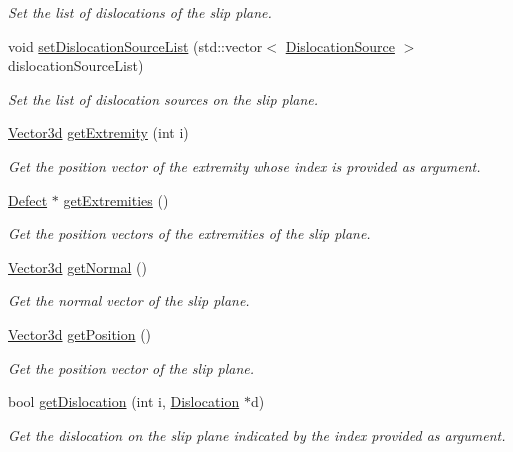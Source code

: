 \begin{DoxyCompactItemize}
\begin{DoxyCompactList}\small\item\em Set the list of dislocations of the slip plane. \end{DoxyCompactList}\item 
void \hyperlink{classSlipPlane_a6f520005b3c7e8c93df0b893201cea29}{set\-Dislocation\-Source\-List} (std\-::vector$<$ \hyperlink{classDislocationSource}{Dislocation\-Source} $>$ dislocation\-Source\-List)
\begin{DoxyCompactList}\small\item\em Set the list of dislocation sources on the slip plane. \end{DoxyCompactList}\item 
\hyperlink{classVector3d}{Vector3d} \hyperlink{classSlipPlane_ad2879c70242d30e34cc4c52d90413ef4}{get\-Extremity} (int i)
\begin{DoxyCompactList}\small\item\em Get the position vector of the extremity whose index is provided as argument. \end{DoxyCompactList}\item 
\hyperlink{classDefect}{Defect} $\ast$ \hyperlink{classSlipPlane_a6559d8a911b5c13e7b2ff4e99372d5b2}{get\-Extremities} ()
\begin{DoxyCompactList}\small\item\em Get the position vectors of the extremities of the slip plane. \end{DoxyCompactList}\item 
\hyperlink{classVector3d}{Vector3d} \hyperlink{classSlipPlane_ab272f2aca3f35aed68343cf02354b7ba}{get\-Normal} ()
\begin{DoxyCompactList}\small\item\em Get the normal vector of the slip plane. \end{DoxyCompactList}\item 
\hyperlink{classVector3d}{Vector3d} \hyperlink{classSlipPlane_a151558f8f223ac316f4208246d16afca}{get\-Position} ()
\begin{DoxyCompactList}\small\item\em Get the position vector of the slip plane. \end{DoxyCompactList}\item 
bool \hyperlink{classSlipPlane_a78a1ad5ab85d8ec3c3c4a7d430a0e610}{get\-Dislocation} (int i, \hyperlink{classDislocation}{Dislocation} $\ast$d)
\begin{DoxyCompactList}\small\item\em Get the dislocation on the slip plane indicated by the index provided as argument. \end{DoxyCompactList}\item 

\end{DoxyCompactItemize}

